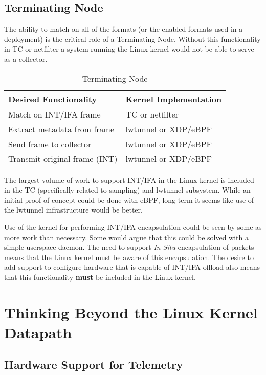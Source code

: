 \documentclass[letterpaper,twocolumn,10pt]{article}
\begin{document}
\subsection{Terminating Node}
The ability to match on all of the formats (or the enabled formats used
in a deployment) is the critical role of a Terminating Node.  Without this
functionality in TC or netfilter a system running the Linux kernel would
not be able to serve as a collector.
\begin{table}[h!]
  \begin{center}
    \caption{Terminating Node}
    \label{tab:table3}
    \begin{tabular}{l|l}
      \textbf{Desired Functionality} & \textbf{Kernel Implementation} \\
      \hline
      Match on INT/IFA frame & TC or netfilter \\
      \hline
      Extract metadata from frame & lwtunnel or XDP/eBPF \\
      \hline
      Send frame to collector & lwtunnel or XDP/eBPF \\
      \hline
      Transmit original frame (INT) & lwtunnel or XDP/eBPF \\
    \end{tabular}
  \end{center}
\end{table}

The largest volume of work to support INT/IFA in the Linux kernel
is included in the TC (specifically related to sampling) and lwtunnel
subsystem.  While an initial proof-of-concept could be done with eBPF,
long-term it seems like use of the lwtunnel infrastructure would be
better.

Use of the kernel for performing INT/IFA encapsulation could be seen by
some as more work than necessary.  Some would argue that this could be
solved with a simple userspace daemon.  The need to support
\textit{In-Situ} encapsulation of packets means that the Linux kernel
must be aware of this encapsulation.  The desire to add support to
configure hardware that is capable of INT/IFA offload also means that
this functionality \textbf{must} be included in the Linux kernel.

\section{Thinking Beyond the Linux Kernel Datapath}

\subsection{Hardware Support for Telemetry}
\end{document}
